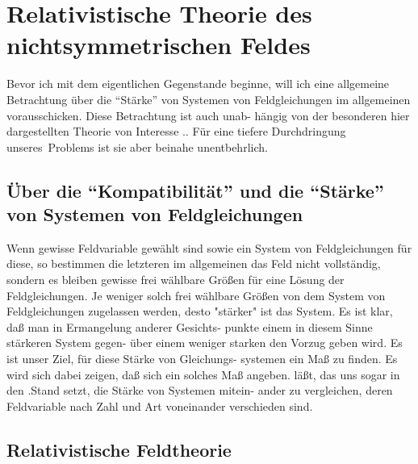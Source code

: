 %
%

\section{%
Relativistische Theorie des nichtsymmetrischen Feldes}
\label{sec:anh-2}

Bevor ich mit dem eigentlichen Gegenstande beginne,
will ich eine allgemeine Betrachtung über die \enquote{Stärke}
von Systemen von Feldgleichungen im allgemeinen
vorausschicken. Diese Betrachtung ist auch unab-
hängig von der besonderen hier dargestellten Theorie
von Interesse .. Für eine tiefere Durchdringung unseres\
Problems ist sie aber beinahe unentbehrlich.

\subsection{Über die \enquote{Kompatibilität}
und die \enquote{Stärke} von Systemen von Feldgleichungen}


Wenn gewisse Feldvariable gewählt sind sowie ein
System von Feldgleichungen für diese, so bestimmen die
letzteren im allgemeinen das Feld nicht vollständig,
sondern es bleiben gewisse frei wählbare Größen für
eine Lösung der Feldgleichungen. Je weniger solch frei
wählbare Größen von dem System von Feldgleichungen
zugelassen werden, desto "stärker" ist das System. Es
ist klar, daß man in Ermangelung anderer Gesichts-
punkte einem in diesem Sinne stärkeren System gegen-
über einem weniger starken den Vorzug geben wird.
Es ist unser Ziel, für diese Stärke von Gleichungs-
systemen ein Maß zu finden. Es wird sich dabei zeigen,
daß sich ein solches Maß angeben. läßt, das uns sogar
in den .Stand setzt, die Stärke von Systemen mitein-
ander zu vergleichen, deren Feldvariable nach Zahl und
Art voneinander verschieden sind.

\subsection{Relativistische Feldtheorie}


